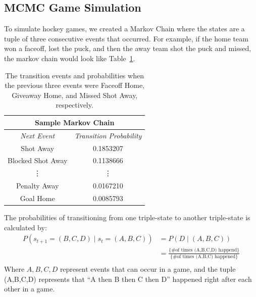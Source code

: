 \documentclass[11pt]{article}
\begin{document}
\subsection{MCMC Game Simulation}

To simulate hockey games, we created a Markov Chain where the states are a tuple of three consecutive
events that occurred. For example, if the home team won a faceoff, lost the puck, and 
then the away team shot the puck and missed, the markov chain would look like Table~\ref{tab:markov_chain_sample}.

\begin{table}
    \centering
    \begin{tabular}{ |c|c| } 
    \hline
        \multicolumn{2}{|c|}{\textbf{Sample Markov Chain}} \\
     \hline
     \textit{Next Event} & \textit{Transition Probability} \\ 
     \hline
     Shot Away & 0.1853207 \\ 
     \hline
     Blocked Shot Away & 0.1138666 \\ 
     \hline
     \vdots & \vdots \\
    \hline
    Penalty Away & 0.0167210 \\
    \hline
    Goal Home & 0.0085793 \\
    \hline
    \end{tabular}
    \caption{The transition events and probabilities when the previous three events were Faceoff Home, Giveaway Home, and Missed
    Shot Away, respectively.}
    \label{tab:markov_chain_sample}
\end{table}


The probabilities of transitioning from one triple-state to another triple-state is calculated by:
\begin{align*}
    P(s_{t+1} = (B,C,D) \;|\; s_t = (A,B,C)) &= P(D \;|\; (A,B,C)) \\
    &= \frac{\{ \text{\# of times (A,B,C,D) happend}\}}{\{ \text{\# of times (A,B,C) happened}\}} \\
\end{align*}
Where $A,B,C,D$ represent events that can occur in a game, and the tuple (A,B,C,D) represents that ``A then 
B then C then D'' happened right after each other in a game.
\end{document}
